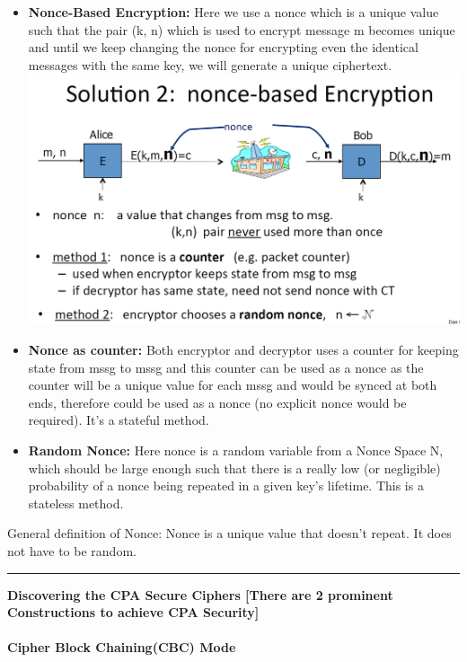 \documentclass[11pt]{article}
\makeatletter
\def\maxwidth{\ifdim\Gin@nat@width>\linewidth\linewidth
    \else\Gin@nat@width\fi}
\let\Oldincludegraphics\includegraphics
\renewcommand{\includegraphics}[1]{\Oldincludegraphics[width=.8\maxwidth]{#1}}
\makeatother
\begin{document}
\begin{itemize}
\item
  \textbf{Nonce-Based Encryption:} Here we use a nonce which is a unique
  value such that the pair (k, n) which is used to encrypt message m
  becomes unique and until we keep changing the nonce for encrypting
  even the identical messages with the same key, we will generate a
  unique ciphertext. \includegraphics{./Images/NonceBasedEncryption.png}
\item
  \textbf{Nonce as counter:} Both encryptor and decryptor uses a counter
  for keeping state from mssg to mssg and this counter can be used as a
  nonce as the counter will be a unique value for each mssg and would be
  synced at both ends, therefore could be used as a nonce (no explicit
  nonce would be required). It's a stateful method.
\item
  \textbf{Random Nonce:} Here nonce is a random variable from a Nonce
  Space N, which should be large enough such that there is a really low
  (or negligible) probability of a nonce being repeated in a given key's
  lifetime. This is a stateless method.
\end{itemize}

General definition of Nonce: Nonce is a unique value that doesn't
repeat. It does not have to be random.

\begin{center}\rule{0.5\linewidth}{\linethickness}\end{center}

    \textbf{Discovering the CPA Secure Ciphers {[}There are 2 prominent
Constructions to achieve CPA Security{]}}

\hypertarget{cipher-block-chainingcbc-mode}{%
\paragraph{Cipher Block Chaining(CBC)
Mode}\label{cipher-block-chainingcbc-mode}}
\end{document}
